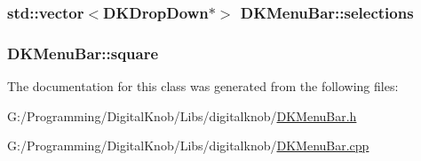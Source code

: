 \hypertarget{class_d_k_menu_bar_a421a12e43dec97ae6262997fce27dbcd}{
\subsubsection[{selections}]{\setlength{\rightskip}{0pt plus 5cm}std\-::vector$<${\bf D\-K\-Drop\-Down}$\ast$$>$ D\-K\-Menu\-Bar\-::selections}}\label{class_d_k_menu_bar_a421a12e43dec97ae6262997fce27dbcd}
\hypertarget{class_d_k_menu_bar_a06f2eec8dc05bdc01429a5a76d8d283d}{
\subsubsection[{square}]{ D\-K\-Menu\-Bar\-::square}}\label{class_d_k_menu_bar_a06f2eec8dc05bdc01429a5a76d8d283d}


The documentation for this class was generated from the following files\-:\begin{DoxyCompactItemize}
\item 
G\-:/\-Programming/\-Digital\-Knob/\-Libs/digitalknob/\hyperlink{_d_k_menu_bar_8h}{D\-K\-Menu\-Bar.\-h}\item 
G\-:/\-Programming/\-Digital\-Knob/\-Libs/digitalknob/\hyperlink{_d_k_menu_bar_8cpp}{D\-K\-Menu\-Bar.\-cpp}\end{DoxyCompactItemize}
